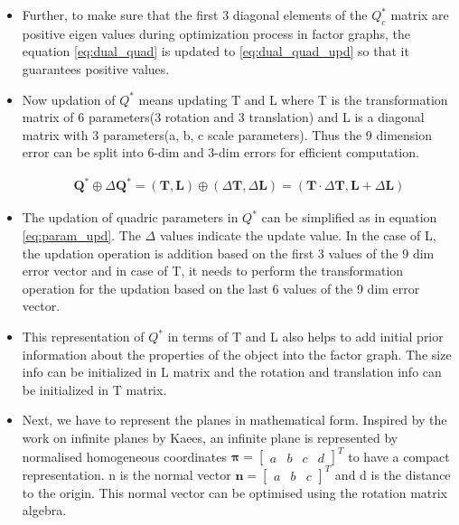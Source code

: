 \documentclass{article}
\begin{document}
\begin{itemize}
\item Further, to make sure that the first 3 diagonal elements of the ${Q}_{c}^{*}$ matrix are positive eigen values during optimization process in factor graphs, the equation \ref{eq:dual_quad} is updated to \ref{eq:dual_quad_upd} so that it guarantees positive values.
\item Now updation of ${Q}^{*}$ means updating T and L where T is the transformation matrix of 6 parameters(3 rotation and 3 translation) and L is a diagonal matrix with 3 parameters(a, b, c scale parameters). Thus the 9 dimension error can be split into 6-dim and 3-dim errors for efficient computation.

\begin{equation}
{
\begin{aligned}
\mathbf{Q}^{*} \oplus \Delta \mathbf{Q}^{*}=(\mathbf{T}, \mathbf{L}) \oplus(\Delta \mathbf{T}, \Delta \mathbf{L})=(\mathbf{T} \cdot \Delta \mathbf{T}, \mathbf{L}+\Delta \mathbf{L})
\end{aligned}
} \label{eq:param_upd}
\end{equation}

\item The updation of quadric parameters in ${Q}^{*}$ can be simplified as in equation \ref{eq:param_upd}. The $\Delta$ values indicate the update value. In the case of L, the updation operation is addition based on the first 3 values of the 9 dim error vector and in case of T, it needs to perform the transformation operation for the updation based on the last 6 values of the 9 dim error vector.
\item This representation of ${Q}^{*}$ in terms of T and L also helps to add initial prior information about the properties of the object into the factor graph. The size info can be initialized in L matrix and the rotation and translation info can be initialized in T matrix.

\item Next, we have to represent the planes in mathematical form. Inspired by the work on infinite planes by Kaees\cite{infiniteplanes}, an infinite plane is represented by normalised homogeneous coordinates $\mathbf{\pi}=
{\begin{bmatrix}
    a & b & c & d
\end{bmatrix}}^{T}
$ to have a compact representation. n is the normal vector 
$\mathbf{n}=
{\begin{bmatrix}
    a & b & c
\end{bmatrix}}^{T}
$ and d is the distance to the origin. This normal vector can be optimised using the rotation matrix algebra.


\end{itemize}
\end{document}
